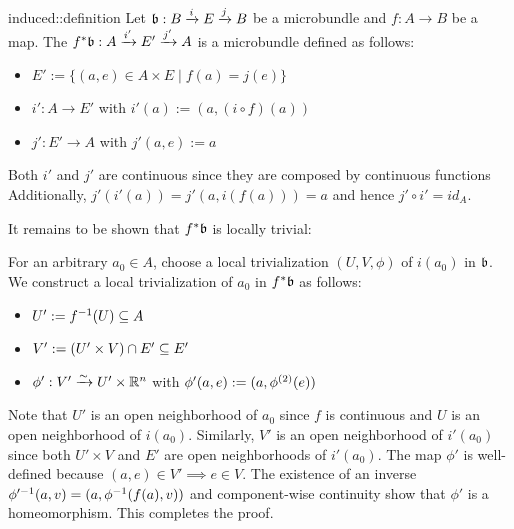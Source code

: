 \begin{mydefinition}{induced::definition}{}
    Let $\bb: \bundle{B}{E}{i}{j}$ be a microbundle and $f: A \to B$ be a map.
    The  $\bundledef{\ind{f}\bb}{A}{E'}{i'}{j'}$ is a microbundle defined as follows:
    \begin{itemize}
        \item $E' := \{ (a, e) \in A \times E \mid f(a) = j(e) \}$
        \item $i': A \to E'$ with $i'(a) := (a, (i \circ f)(a))$
        \item $j': E' \to A$ with $j'(a, e) := a$
    \end{itemize}
\end{mydefinition}

\begin{myproof}
    Both $i'$ and $j'$ are continuous since they are composed by continuous functions
    Additionally, $j'(i'(a)) = j'(a, i(f(a))) = a$ and hence $j' \circ i' = id_A$.

    It remains to be shown that $\ind{f}\bb$ is locally trivial:

    For an arbitrary $a_0 \in A$, choose a local trivialization $(U, V, \phi)$ of $i(a_0)$ in $\bb$.
    We construct a local trivialization of $a_0$ in $\ind{f}\bb$ as follows:
    \begin{itemize}
        \item $U' := \inv{f}(U) \sub A$
        \item $V' := (U' \times V) \cap E' \sub E'$
        \item $\phi': V' \isomto U' \times \R^n$ with $\phi'(a, e) := (a, \snd{\phi}(e))$
    \end{itemize}
    Note that $U'$ is an open neighborhood of $a_0$ since $f$ is continuous and $U$ is an open neighborhood of $i(a_0)$.
    Similarly, $V'$ is an open neighborhood of $i'(a_0)$ since both $U' \times V$ and $E'$ are open neighborhoods of $i'(a_0)$.
    The map $\phi'$ is well-defined because $(a, e) \in V' \implies e \in V$.
    The existence of an inverse $\inv{\phi'}(a, v) = (a, \inv{\phi}(f(a), v))$ and component-wise continuity show that $\phi'$ is a homeomorphism.
    This completes the proof. 
\end{myproof}